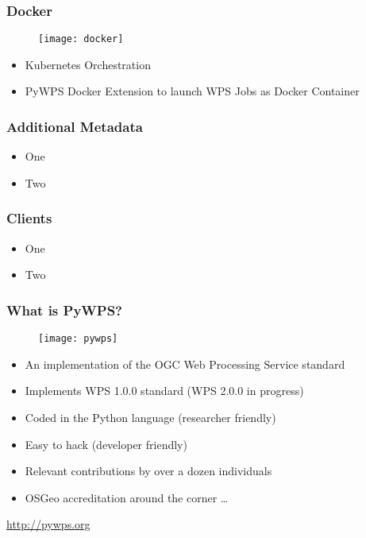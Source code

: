 \documentclass{beamer}
\begin{document}
\begin{frame}
\frametitle<presentation>{Docker}

  \begin{figure}[ht]
    \centering
    \texttt{[image: docker]}
  \end{figure}

  \begin{itemize}
    \item Kubernetes Orchestration
    \item PyWPS Docker Extension to launch WPS Jobs as Docker Container
  \end{itemize}

\end{frame}

\begin{frame}
\frametitle<presentation>{Additional Metadata}

  \begin{itemize}
    \item One
    \item Two
  \end{itemize}

\end{frame}

\begin{frame}
\frametitle<presentation>{Clients}

  \begin{itemize}
    \item One
    \item Two
  \end{itemize}

\end{frame}

\begin{frame}
\frametitle<presentation>{What is PyWPS?}

  \begin{figure}[ht]
    \centering
    \texttt{[image: pywps]}
  \end{figure}

  \begin{itemize}
    \item An implementation of the OGC Web Processing Service standard
    \item Implements WPS 1.0.0 standard (WPS 2.0.0 in progress)
    \item Coded in the Python language (researcher friendly)
    \item Easy to hack (developer friendly)
    \item Relevant contributions by over a dozen individuals
    \item OSGeo accreditation around the corner \ldots
  \end{itemize}

  \vspace{0.2cm}
  \centering
  \footnotesize{\url{http://pywps.org}}

\end{frame}
\end{document}
